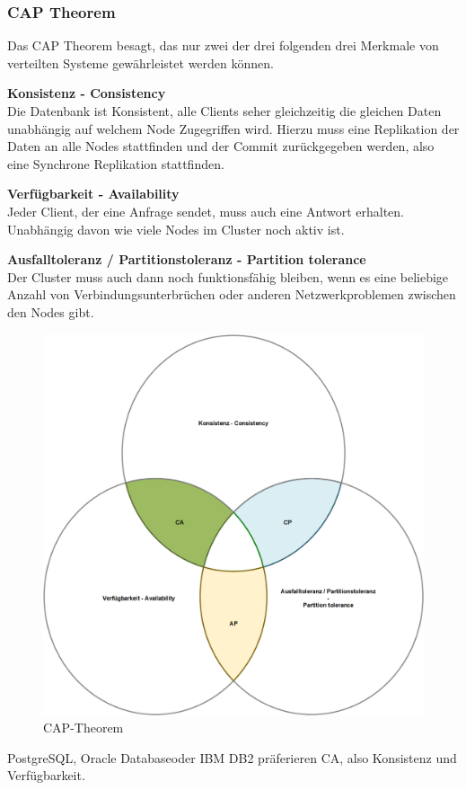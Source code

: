 
\subsubsection{CAP Theorem}
Das CAP Theorem besagt, das nur zwei der drei folgenden drei Merkmale von verteilten Systeme gewährleistet werden können\cite{EE6EQHU2}.
\begin{flushleft}
\textbf{Konsistenz - Consistency}\\
    Die Datenbank ist Konsistent, alle Clients seher gleichzeitig die gleichen Daten unabhängig auf welchem Node Zugegriffen wird.
    Hierzu muss eine Replikation der Daten an alle Nodes stattfinden und der Commit zurückgegeben werden, also eine Synchrone Replikation stattfinden.
\end{flushleft}
\begin{flushleft}
\textbf{Verfügbarkeit - Availability}\\
    Jeder Client, der eine Anfrage sendet, muss auch eine Antwort erhalten.
    Unabhängig davon wie viele Nodes im Cluster noch aktiv ist.
\end{flushleft}
\begin{flushleft}
\textbf{Ausfalltoleranz / Partitionstoleranz - Partition tolerance}\\
    Der Cluster muss auch dann noch funktionsfähig bleiben, wenn es eine beliebige Anzahl von Verbindungsunterbrüchen oder anderen Netzwerkproblemen zwischen den Nodes gibt.

\end{flushleft}

\begin{figure}[H]
    \centering
    \includegraphics[width=1\linewidth]{source/implementation/evaluation/excursus_architecture/cap_theorem}
    \caption{CAP-Theorem}
    \label{fig:cap_theorem}
\end{figure}

\Gls{PostgreSQL}, \Gls{Oracle Database}oder \Gls{IBM DB2} präferieren CA, also Konsistenz und Verfügbarkeit.